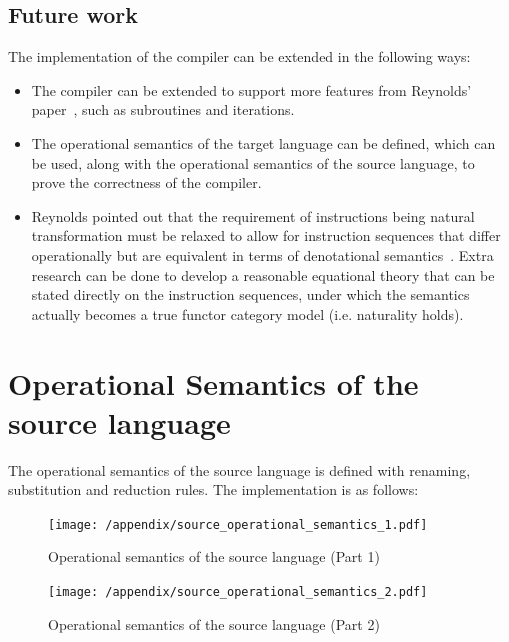 \documentclass[12pt,a4paper]{report}
\theoremstyle{definition}
\begin{document}
    \section{Future work}
    The implementation of the compiler can be extended in the following ways:
    \begin{itemize}
        \item 
            The compiler can be extended to support more features from Reynolds' paper~\autocite{Reynolds}, such as subroutines and iterations.
        \item
            The operational semantics of the target language can be defined, which can be used, along with the operational semantics of the source language, to prove the correctness of the compiler.
        \item
            Reynolds pointed out that the requirement of instructions being natural transformation must be relaxed to allow for instruction sequences that differ operationally but are equivalent in terms of denotational semantics~\autocite[Ch. 6]{Reynolds}. Extra research can be done to develop a reasonable equational theory that can be stated directly on the instruction sequences, under which the semantics actually becomes a true functor category model (i.e. naturality holds).
    \end{itemize}

\printbibliography

\appendix

\chapter{Operational Semantics of the source language} \label{app: operational_semantics}
    The operational semantics of the source language is defined with renaming, substitution and reduction rules. The implementation is as follows:
    \begin{figure}[H]
        \centering
        \texttt{[image: /appendix/source\_operational\_semantics\_1.pdf]}
        \caption{Operational semantics of the source language (Part 1)}
        \label{fig: operational_semantics_1}
    \end{figure}
    \begin{figure}[H]
        \centering
        \texttt{[image: /appendix/source\_operational\_semantics\_2.pdf]}
        \caption{Operational semantics of the source language (Part 2)}
        \label{fig: operational_semantics_2}
    \end{figure}
\end{document}
